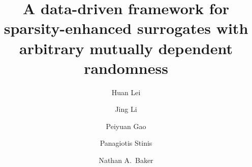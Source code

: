 \documentclass[review]{elsarticle}
\newcommand{\blue}[1]{{\color{blue}#1}}
\begin{document}
\begin{frontmatter}

\title{%
\blue{A data-driven framework for sparsity-enhanced 
surrogates with arbitrary mutually dependent randomness}\\
}



\author[Leiaddress]{Huan Lei}
\address[Leiaddress]{Pacific Northwest National Laboratory, Richland, WA 99352.}%
\author[Leiaddress]{Jing Li }
\author[Leiaddress]{Peiyuan Gao}
\author[Leiaddress,UWaddress]{Panagiotis Stinis}
\address[UWaddress]{Department of Applied Mathematics, University of Washington, Seattle, WA 98195.}%
\author[Leiaddress,Brownaddress]{Nathan A.\ Baker}
\address[Brownaddress]{Division of Applied Mathematics, Brown University, Providence, RI 02912.}%




\end{frontmatter}
\end{document}
